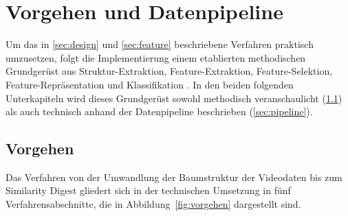 \section{Vorgehen und Datenpipeline}
\label{sec:vorgpipe}

Um das in \cref{sec:design} und \cref{sec:feature} beschriebene Verfahren praktisch umzusetzen, folgt die Implementierung einem etablierten methodischen Grundgerüst aus Struktur-Extraktion, Feature-Extraktion, Feature-Selektion, Feature-Repräsentation und Klassifikation \cite[Fig.~4]{yang_comprehensive_2025}. In den beiden folgenden Unterkapiteln wird dieses Grundgerüst sowohl methodisch veranschaulicht (\cref{sec:vorgehen}) als auch technisch anhand der Datenpipeline beschrieben (\cref{sec:pipeline}).


\subsection{Vorgehen}
\label{sec:vorgehen}

Das Verfahren von der Umwandlung der Baumstruktur der Videodaten bis zum Similarity Digest gliedert sich in der technischen Umsetzung in fünf Verfahrensabschnitte, die in Abbildung~\ref{fig:vorgehen} dargestellt sind.

